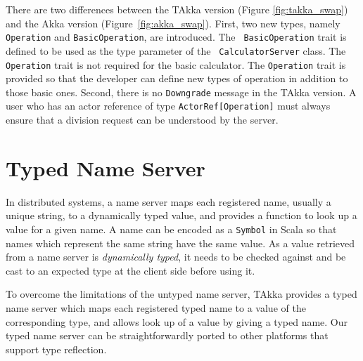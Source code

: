 There are two differences between the TAkka version (Figure 
\ref{fig:takka_swap}) and the Akka version (Figure~\ref{fig:akka_swap}).  First, two 
new types, namely {\tt Operation} and {\tt BasicOperation}, are introduced. The {\tt 
BasicOperation} trait is defined to be used as the type parameter of the {\tt 
CalculatorServer} class.  The {\tt Operation} trait is not required for the 
basic calculator.  The {\tt Operation} trait is provided so that the developer 
can define new types of operation in addition to those basic ones.  Second, 
there is no {\tt Downgrade} message in the TAkka version.  A user who has an 
actor reference of type {\tt ActorRef[Operation]} must always ensure that a division 
request can be understood by the server.



\section{Typed Name Server}
\label{nameserver}

In distributed systems, a name server maps each registered name, usually a
unique string, to a dynamically typed value, and provides a function to look up 
a value for a given name. A name can be encoded as a {\tt Symbol} in Scala so 
that names which represent the same string have the same value.  As a value 
retrieved from a name server is {\it dynamically typed}, it needs to be checked 
against and be cast to an expected type at the client side before using it.

To overcome the limitations of the untyped name server, TAkka provides
a typed name server which maps each registered typed name to a value of the
corresponding type, and allows look up of a value by giving a typed name.  Our 
typed name server can be straightforwardly ported to other platforms that 
support type reflection.

